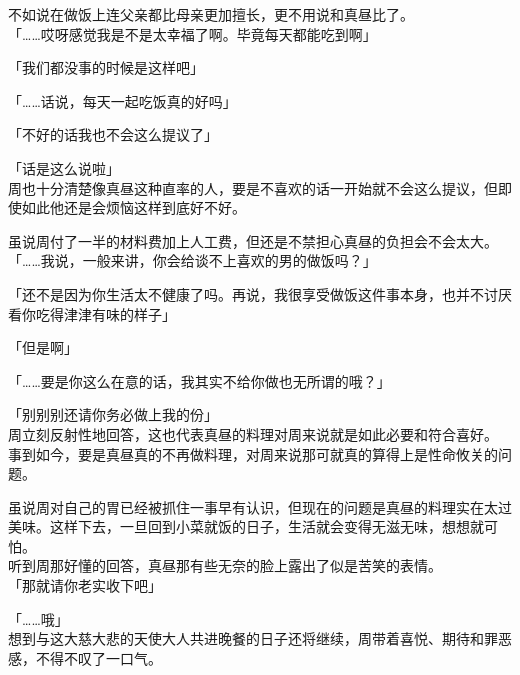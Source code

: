 不如说在做饭上连父亲都比母亲更加擅长，更不用说和真昼比了。\\

「……哎呀感觉我是不是太幸福了啊。毕竟每天都能吃到啊」

「我们都没事的时候是这样吧」

「……话说，每天一起吃饭真的好吗」

「不好的话我也不会这么提议了」

「话是这么说啦」\\

周也十分清楚像真昼这种直率的人，要是不喜欢的话一开始就不会这么提议，但即使如此他还是会烦恼这样到底好不好。

虽说周付了一半的材料费加上人工费，但还是不禁担心真昼的负担会不会太大。\\

「……我说，一般来讲，你会给谈不上喜欢的男的做饭吗？」

「还不是因为你生活太不健康了吗。再说，我很享受做饭这件事本身，也并不讨厌看你吃得津津有味的样子」

「但是啊」

「……要是你这么在意的话，我其实不给你做也无所谓的哦？」

「别别别还请你务必做上我的份」\\

周立刻反射性地回答，这也代表真昼的料理对周来说就是如此必要和符合喜好。\\

事到如今，要是真昼真的不再做料理，对周来说那可就真的算得上是性命攸关的问题。

虽说周对自己的胃已经被抓住一事早有认识，但现在的问题是真昼的料理实在太过美味。这样下去，一旦回到小菜就饭的日子，生活就会变得无滋无味，想想就可怕。\\

听到周那好懂的回答，真昼那有些无奈的脸上露出了似是苦笑的表情。\\

「那就请你老实收下吧」

「……哦」\\

想到与这大慈大悲的天使大人共进晚餐的日子还将继续，周带着喜悦、期待和罪恶感，不得不叹了一口气。
